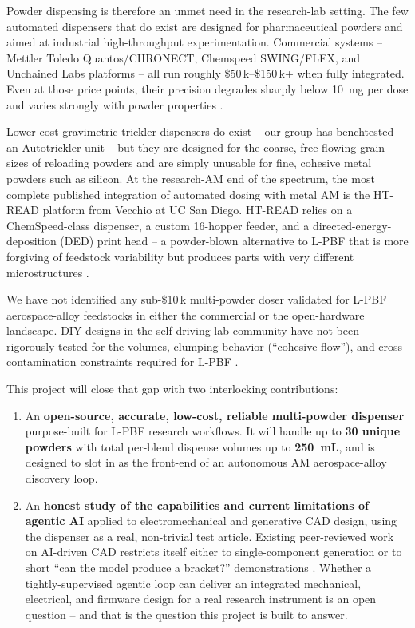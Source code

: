 \documentclass[11pt]{article}
\begin{document}
Powder dispensing is therefore an unmet need in the research-lab
setting.  The few automated dispensers that do exist are designed for
pharmaceutical powders and aimed at industrial high-throughput
experimentation.  Commercial systems -- Mettler Toledo
Quantos/CHRONECT, Chemspeed SWING/FLEX, and Unchained Labs platforms --
all run roughly \$50\,k--\$150\,k+ when fully integrated.  Even at
those price points, their precision degrades sharply below 10~mg per
dose and varies strongly with powder properties
\citep{bahr2018collaborative,bahr2020recent}.

Lower-cost gravimetric trickler dispensers do exist -- our group has
benchtested an Autotrickler unit -- but they are designed for the
coarse, free-flowing grain sizes of reloading powders and are simply
unusable for fine, cohesive metal powders such as silicon.  At the
research-AM end of the spectrum, the most complete published
integration of automated dosing with metal AM is the HT-READ platform
from Vecchio at UC San Diego.  HT-READ relies on a ChemSpeed-class
dispenser, a custom 16-hopper feeder, and a directed-energy-deposition
(DED) print head -- a powder-blown alternative to L-PBF that is more
forgiving of feedstock variability but produces parts with very
different microstructures \citep{vecchio2024htread,vecchio2021htread}.

We have not identified any sub-\$10\,k multi-powder doser validated
for L-PBF aerospace-alloy feedstocks in either the commercial or the
open-hardware landscape.  DIY designs in the self-driving-lab
community have not been rigorously tested for the volumes, clumping
behavior (``cohesive flow''), and cross-contamination constraints
required for L-PBF
\citep{tom2024sdl,lo2024frugal,pelkie2025democratizing}.

This project will close that gap with two interlocking contributions:

\begin{enumerate}[leftmargin=1.5em,itemsep=0.25em,topsep=0.15em,label=(\arabic*)]
  \item An \textbf{open-source, accurate, low-cost, reliable
        multi-powder dispenser} purpose-built for L-PBF research
        workflows.  It will handle up to \textbf{30 unique powders}
        with total per-blend dispense volumes up to \textbf{250~mL},
        and is designed to slot in as the front-end of an autonomous
        AM aerospace-alloy discovery loop.
  \item An \textbf{honest study of the capabilities and current
        limitations of agentic AI} applied to electromechanical and
        generative CAD design, using the dispenser as a real,
        non-trivial test article.  Existing peer-reviewed work on
        AI-driven CAD restricts itself either to single-component
        generation or to short ``can the model produce a bracket?''
        demonstrations
        \citep{wu2021deepcad,xie2025text2cadquery,rukhovich2025cadrecode}.
        Whether a tightly-supervised agentic loop can deliver an
        integrated mechanical, electrical, and firmware design for a
        real research instrument is an open question -- and that is
        the question this project is built to answer.
\end{enumerate}
\end{document}
